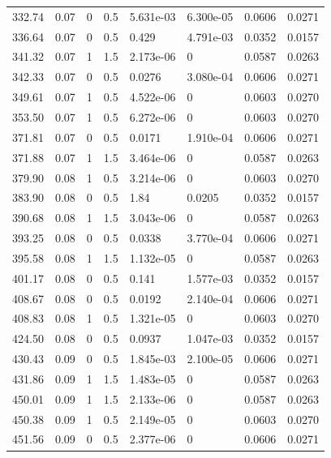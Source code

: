 \documentclass[preview]{standalone}
\begin{document}
{{{\begin{tabular}{L{1.2cm}C{1.2cm} C{0.3cm}C{0.5cm} C{1.4cm}C{1.4cm} C{1.4cm}C{1.4cm}}
  332.74  &  0.07  & 0     & 0.5 &  5.631e-03  & 6.300e-05  & 0.0606 &  0.0271   \\ 
  336.64  &  0.07  & 0     & 0.5 &  0.429  & 4.791e-03  & 0.0352 &  0.0157   \\ 
  341.32  &  0.07  & 1     & 1.5 &  2.173e-06  & 0  & 0.0587 &  0.0263   \\ 
  342.33  &  0.07  & 0     & 0.5 &  0.0276  & 3.080e-04  & 0.0606 &  0.0271   \\ 
  349.61  &  0.07  & 1     & 0.5 &  4.522e-06  & 0  & 0.0603 &  0.0270   \\ 
  353.50  &  0.07  & 1     & 0.5 &  6.272e-06  & 0  & 0.0603 &  0.0270   \\ 
  371.81  &  0.07  & 0     & 0.5 &  0.0171  & 1.910e-04  & 0.0606 &  0.0271   \\ 
  371.88  &  0.07  & 1     & 1.5 &  3.464e-06  & 0  & 0.0587 &  0.0263   \\ 
  379.90  &  0.08  & 1     & 0.5 &  3.214e-06  & 0  & 0.0603 &  0.0270   \\ 
  383.90  &  0.08  & 0     & 0.5 &  1.84  & 0.0205  & 0.0352 &  0.0157   \\ 
  390.68  &  0.08  & 1     & 1.5 &  3.043e-06  & 0  & 0.0587 &  0.0263   \\ 
  393.25  &  0.08  & 0     & 0.5 &  0.0338  & 3.770e-04  & 0.0606 &  0.0271   \\ 
  395.58  &  0.08  & 1     & 1.5 &  1.132e-05  & 0  & 0.0587 &  0.0263   \\ 
  401.17  &  0.08  & 0     & 0.5 &  0.141  & 1.577e-03  & 0.0352 &  0.0157   \\ 
  408.67  &  0.08  & 0     & 0.5 &  0.0192  & 2.140e-04  & 0.0606 &  0.0271   \\ 
  408.83  &  0.08  & 1     & 0.5 &  1.321e-05  & 0  & 0.0603 &  0.0270   \\ 
  424.50  &  0.08  & 0     & 0.5 &  0.0937  & 1.047e-03  & 0.0352 &  0.0157   \\ 
  430.43  &  0.09  & 0     & 0.5 &  1.845e-03  & 2.100e-05  & 0.0606 &  0.0271   \\ 
  431.86  &  0.09  & 1     & 1.5 &  1.483e-05  & 0  & 0.0587 &  0.0263   \\ 
  450.01  &  0.09  & 1     & 1.5 &  2.133e-06  & 0  & 0.0587 &  0.0263   \\ 
  450.38  &  0.09  & 1     & 0.5 &  2.149e-05  & 0  & 0.0603 &  0.0270   \\ 
  451.56  &  0.09  & 0     & 0.5 &  2.377e-06  & 0  & 0.0606 &  0.0271   \\ 

\end{tabular}}}}
\end{document}
